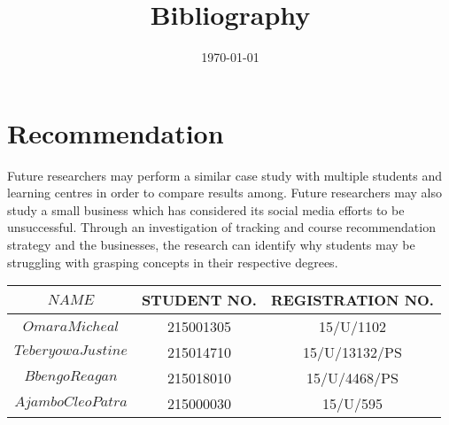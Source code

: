 \documentclass{article}
\begin{document}
\section{Recommendation}
Future researchers may perform a similar case study with multiple students and learning centres in order to compare results among. Future researchers may also study a small business which has considered its
social media efforts to be unsuccessful. Through an investigation of tracking and course recommendation strategy and the businesses, the research can identify why students may be struggling with grasping concepts in their respective degrees.

\title{Bibliography}
\author{}
\maketitle
\date{\today}




\begin{tabular}{|c|c|c|}
	
	
\hline	$NAME$ & STUDENT NO. & REGISTRATION NO. \\ \hline
\hline	$Omara Micheal$ & 215001305 &15/U/1102 \\ \hline
\hline	$Teberyowa Justine$ &215014710 & 15/U/13132/PS \\ \hline
\hline	$Bbengo Reagan$ & 215018010 & 15/U/4468/PS \\ \hline
\hline	$Ajambo Cleo Patra$ & 215000030 & 15/U/595 \\ \hline
	
	
\end{tabular}
\end{document}
